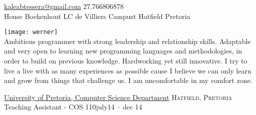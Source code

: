 

\sloppy  %




\nobreakvspace{0.3em}  %

\noindent\href{mailto:kaleabtessera.at.gmail.dot.com}{kaleabtessera\mbox{}@\mbox{}gmail.com}\sbull
\textsmaller{+}27.766806878\sbull
\\
House Boekenhout\sbull
LC de Villiers Campust\sbull
Hatfield\sbull
Pretoria\\

\spacedhrule{0.9em}{-0.4em}  %
\begin{center}
\end{center}


\vspace{-1.3em}  %
\begin{multicols}{3}%

\noindent \texttt{[image: werner]}\\Ambitious programmer with strong leadership and relationship skills. Adaptable and very open to learning new programming languages and methodologies, in order to build on previous knowledge. Hardworking yet still innovative. I try to live a live with as many experiences as possible cause I believe we can only learn and grow from things that challenge us. I am uncomfortable in my comfort zone. 

\end{multicols}

\spacedhrule{0em}{-0.4em}

\headedsection  %
  {\href{http://www.cs.up.ac.za}{University of Pretoria, Computer Science Department}}
  {\textsc{Hatfield, Pretoria}} {%
  \headedsubsection
    {Teaching Assistant - COS 110}{july14 -- dec 14}
    {}
    }
    
